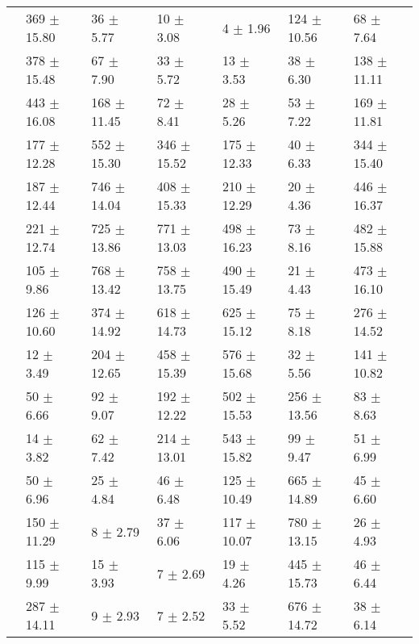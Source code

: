 \begin{table}
{\begin{tabular}[t]{rllllll}
\multirow{-2}{*}{\raggedleft\arraybackslash 7} & 369 $\pm$ 15.80 & 36 $\pm$ 5.77 & 10 $\pm$ 3.08 & 4 $\pm$ 1.96 & 124 $\pm$ 10.56 & 68 $\pm$ 7.64\\
\cmidrule{1-7}
 & 378 $\pm$ 15.48 & 67 $\pm$ 7.90 & 33 $\pm$ 5.72 & 13 $\pm$ 3.53 & 38 $\pm$ 6.30 & 138 $\pm$ 11.11\\

\multirow{-2}{*}{\raggedleft\arraybackslash 8} & 443 $\pm$ 16.08 & 168 $\pm$ 11.45 & 72 $\pm$ 8.41 & 28 $\pm$ 5.26 & 53 $\pm$ 7.22 & 169 $\pm$ 11.81\\
\cmidrule{1-7}
 & 177 $\pm$ 12.28 & 552 $\pm$ 15.30 & 346 $\pm$ 15.52 & 175 $\pm$ 12.33 & 40 $\pm$ 6.33 & 344 $\pm$ 15.40\\

\multirow{-2}{*}{\raggedleft\arraybackslash 9} & 187 $\pm$ 12.44 & 746 $\pm$ 14.04 & 408 $\pm$ 15.33 & 210 $\pm$ 12.29 & 20 $\pm$ 4.36 & 446 $\pm$ 16.37\\
\cmidrule{1-7}
 & 221 $\pm$ 12.74 & 725 $\pm$ 13.86 & 771 $\pm$ 13.03 & 498 $\pm$ 16.23 & 73 $\pm$ 8.16 & 482 $\pm$ 15.88\\

\multirow{-2}{*}{\raggedleft\arraybackslash 10} & 105 $\pm$ 9.86 & 768 $\pm$ 13.42 & 758 $\pm$ 13.75 & 490 $\pm$ 15.49 & 21 $\pm$ 4.43 & 473 $\pm$ 16.10\\
\cmidrule{1-7}
 & 126 $\pm$ 10.60 & 374 $\pm$ 14.92 & 618 $\pm$ 14.73 & 625 $\pm$ 15.12 & 75 $\pm$ 8.18 & 276 $\pm$ 14.52\\

\multirow{-2}{*}{\raggedleft\arraybackslash 11} & 12 $\pm$ 3.49 & 204 $\pm$ 12.65 & 458 $\pm$ 15.39 & 576 $\pm$ 15.68 & 32 $\pm$ 5.56 & 141 $\pm$ 10.82\\
\cmidrule{1-7}
 & 50 $\pm$ 6.66 & 92 $\pm$ 9.07 & 192 $\pm$ 12.22 & 502 $\pm$ 15.53 & 256 $\pm$ 13.56 & 83 $\pm$ 8.63\\

\multirow{-2}{*}{\raggedleft\arraybackslash 12} & 14 $\pm$ 3.82 & 62 $\pm$ 7.42 & 214 $\pm$ 13.01 & 543 $\pm$ 15.82 & 99 $\pm$ 9.47 & 51 $\pm$ 6.99\\
\cmidrule{1-7}
 & 50 $\pm$ 6.96 & 25 $\pm$ 4.84 & 46 $\pm$ 6.48 & 125 $\pm$ 10.49 & 665 $\pm$ 14.89 & 45 $\pm$ 6.60\\

\multirow{-2}{*}{\raggedleft\arraybackslash 13} & 150 $\pm$ 11.29 & 8 $\pm$ 2.79 & 37 $\pm$ 6.06 & 117 $\pm$ 10.07 & 780 $\pm$ 13.15 & 26 $\pm$ 4.93\\
\cmidrule{1-7}
 & 115 $\pm$ 9.99 & 15 $\pm$ 3.93 & 7 $\pm$ 2.69 & 19 $\pm$ 4.26 & 445 $\pm$ 15.73 & 46 $\pm$ 6.44\\

\multirow{-2}{*}{\raggedleft\arraybackslash 14} & 287 $\pm$ 14.11 & 9 $\pm$ 2.93 & 7 $\pm$ 2.52 & 33 $\pm$ 5.52 & 676 $\pm$ 14.72 & 38 $\pm$ 6.14\\
\bottomrule
\end{tabular}}
\end{table}
